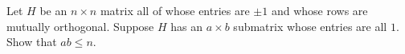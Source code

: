 Let $H$ be an $n \times n$ matrix all of whose entries are $\pm 1$ and
whose rows are mutually orthogonal. Suppose $H$ has an $a \times b$ submatrix
whose entries are all $1$. Show that $ab \leq n$.

